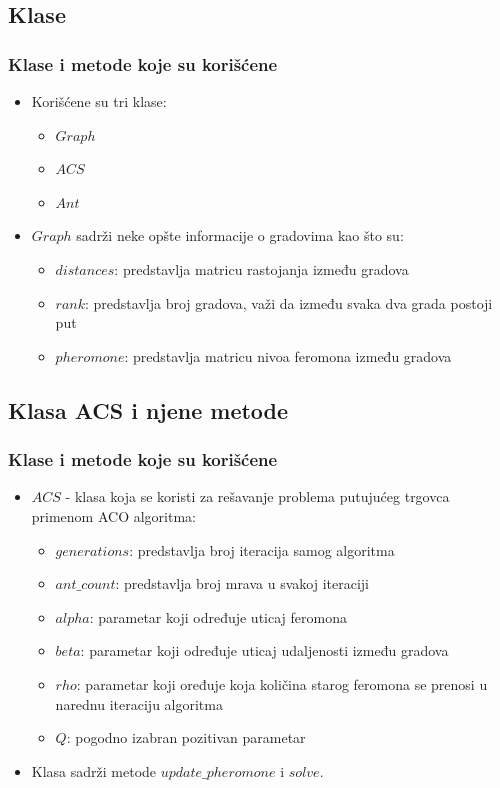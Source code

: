 \documentclass[11pt]{beamer}
\begin{document}
\subsection{Klase}
\begin{frame}{}
\frametitle{Klase i metode koje su korišćene}
\begin{itemize}
  \item Korišćene su tri klase:
  	\begin{itemize}
  		\item $Graph$
  		\item $ACS$
  		\item $Ant$
  	\end{itemize}
  \item $Graph$ sadrži neke opšte informacije o gradovima kao što su:
  	\begin{itemize}
  		\item $distances$: predstavlja matricu rastojanja između gradova
  		\item $rank$: predstavlja broj gradova, važi da između svaka dva grada postoji put
  		\item $pheromone$: predstavlja matricu nivoa feromona između gradova
  	\end{itemize}
\end{itemize}
\end{frame}


\subsection{Klasa ACS i njene metode}
\begin{frame}{}
\frametitle{Klase i metode koje su korišćene}
\begin{itemize}
  \item $ACS$ - klasa koja se koristi za rešavanje problema putujućeg trgovca primenom ACO algoritma:
  	\begin{itemize}
  		\item $generations$: predstavlja broj iteracija samog algoritma
  		\item $ant\_count$: predstavlja broj mrava u svakoj iteraciji
  		\item $alpha$: parametar koji određuje uticaj feromona 
		\item $beta$: parametar koji određuje uticaj udaljenosti između gradova
		\item $rho$: parametar koji oređuje koja količina
starog feromona se prenosi u narednu iteraciju algoritma
		\item $Q$: pogodno izabran pozitivan parametar
  	\end{itemize}
  \item Klasa sadrži metode $update\_pheromone$ i $solve$.
\end{itemize}
\end{frame}
\end{document}
